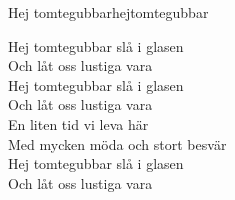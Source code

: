 \begin{song}{Hej tomtegubbar}{hejtomtegubbar}
\begin{vers}
Hej tomtegubbar slå i glasen\\
Och låt oss lustiga vara\\
Hej tomtegubbar slå i glasen\\
Och låt oss lustiga vara\\
En liten tid vi leva här\\
Med mycken möda och stort besvär\\
Hej tomtegubbar slå i glasen\\
Och låt oss lustiga vara\\
\end{vers}
\end{song}
